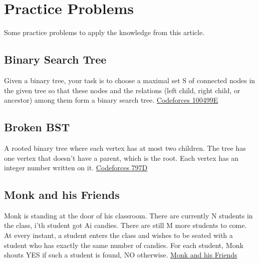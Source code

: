 \documentclass[11pt]{article}
\begin{document}
        
\section{Practice Problems}
    Some practice problems to apply the knowledge from this article.
    \subsection{Binary Search Tree}
    Given a binary tree, your task is to choose a maximal set S of connected nodes in the given tree so that these nodes and the relations (left child, right child, or ancestor) among them form a binary search tree.
    \href{https://codeforces.com/problemset/gymProblem/100499/E}{Codeforces 100499E}
    \subsection{Broken BST}
    A rooted binary tree where each vertex has at most two children. The tree has one vertex that doesn't have a parent, which is the root. Each vertex has an integer number written on it.
    \href{https://codeforces.com/problemset/problem/797/D}{Codeforces 797D}
    \subsection{Monk and his Friends}
    Monk is standing at the door of his classroom. There are currently N students in the class, i'th student got Ai candies. There are still M more students to come. At every instant, a student enters the class and wishes to be seated with a student who has exactly the same number of candies. For each student, Monk shouts YES if such a student is found, NO otherwise.
    \href{https://www.hackerearth.com/practice/data-structures/trees/binary-search-tree/practice-problems/algorithm/monk-and-his-friends/}{Monk and his Friends}




\end{document}
